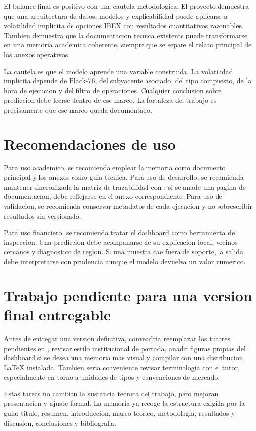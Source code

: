 El balance final es positivo con una cautela metodologica. El proyecto demuestra que una arquitectura de datos, modelos y explicabilidad puede aplicarse a volatilidad implicita de opciones IBEX con resultados cuantitativos razonables. Tambien demuestra que la documentacion tecnica existente puede transformarse en una memoria academica coherente, siempre que se separe el relato principal de los anexos operativos.

La cautela es que el modelo aprende una variable construida. La volatilidad implicita depende de Black-76, del subyacente asociado, del tipo compuesto, de la hora de ejecucion y del filtro de operaciones. Cualquier conclusion sobre prediccion debe leerse dentro de ese marco. La fortaleza del trabajo es precisamente que ese marco queda documentado.

\section{Recomendaciones de uso}

Para uso academico, se recomienda emplear la memoria como documento principal y los anexos como guia tecnica. Para uso de desarrollo, se recomienda mantener sincronizada la matriz de trazabilidad con : si se anade una pagina de documentacion, debe reflejarse en el anexo correspondiente. Para uso de validacion, se recomienda conservar metadatos de cada ejecucion y no sobrescribir resultados sin versionado.

Para uso financiero, se recomienda tratar el dashboard como herramienta de inspeccion. Una prediccion debe acompanarse de su explicacion local, vecinos cercanos y diagnostico de region. Si una muestra cae fuera de soporte, la salida debe interpretarse con prudencia aunque el modelo devuelva un valor numerico.

\section{Trabajo pendiente para una version final entregable}

Antes de entregar una version definitiva, convendria reemplazar los tutores pendientes en , revisar estilo institucional de portada, anadir figuras propias del dashboard si se desea una memoria mas visual y compilar con una distribucion LaTeX instalada. Tambien seria conveniente revisar terminologia con el tutor, especialmente en torno a unidades de tipos y convenciones de mercado.

Estas tareas no cambian la sustancia tecnica del trabajo, pero mejoran presentacion y ajuste formal. La memoria ya recoge la estructura exigida por la guia: titulo, resumen, introduccion, marco teorico, metodologia, resultados y discusion, conclusiones y bibliografia.
